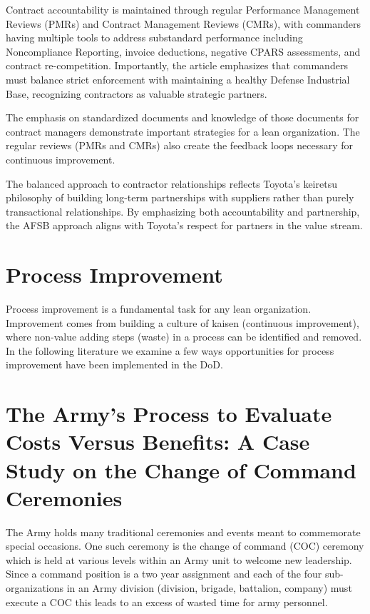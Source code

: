 \documentclass{article}
\begin{document}
		Contract accountability is maintained through regular Performance Management Reviews (PMRs) and Contract Management Reviews (CMRs), with commanders having multiple tools to address substandard performance including Noncompliance Reporting, invoice deductions, negative CPARS assessments, and contract re-competition. 
		Importantly, the article emphasizes that commanders must balance strict enforcement with maintaining a healthy Defense Industrial Base, recognizing contractors as valuable strategic partners.

		The emphasis on standardized documents and knowledge of those documents for contract managers demonstrate important strategies for a lean organization.
		The regular reviews (PMRs and CMRs) also create the feedback loops necessary for continuous improvement.

		The balanced approach to contractor relationships reflects Toyota's keiretsu philosophy of building long-term partnerships with suppliers rather than purely transactional relationships. 
		By emphasizing both accountability and partnership, the AFSB approach aligns with Toyota's respect for partners in the value stream. 


	\section{Process Improvement}

		Process improvement is a fundamental task for any lean organization. 
		Improvement comes from building a culture of kaisen (continuous improvement), where non-value adding steps (waste) in a process can be identified and removed. In the following literature we examine a few ways opportunities for process improvement have been implemented in the DoD.

		\section{The Army's Process to Evaluate Costs Versus Benefits: A Case Study on the Change of Command Ceremonies \cite{Malin2020}}

			The Army holds many traditional ceremonies and events meant to commemorate special occasions. 
			One such ceremony is the change of command (COC) ceremony which is held at various levels within an Army unit to welcome new leadership. 
			Since a command position is a two year assignment and each of the four sub-organizations in an Army division (division, brigade, battalion, company) must execute a COC this leads to an excess of wasted time for army personnel.
\end{document}
